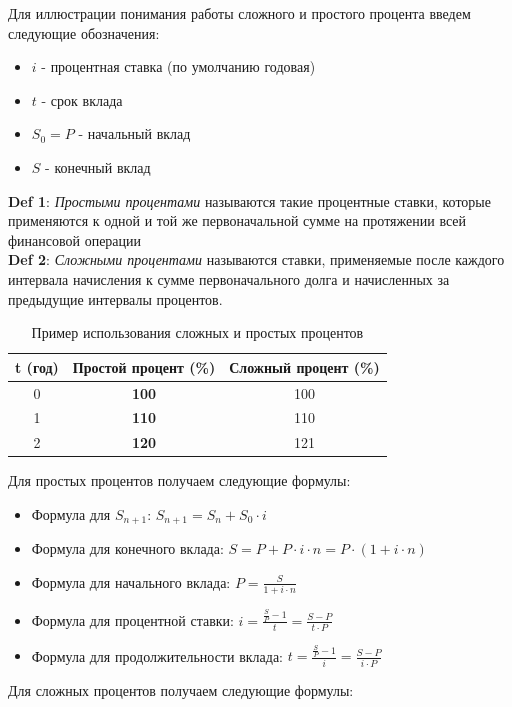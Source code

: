 \documentclass[aps,%
12pt,%
final,%
oneside,
onecolumn,%
musixtex, %
superscriptaddress,%
centertags]{article} %
\begin{document}
Для иллюстрации понимания работы сложного и простого процента введем следующие обозначения:
\begin{itemize} 
  \item $i$ - процентная ставка (по умолчанию годовая)
  \item $t$ - срок вклада
  \item $S_{0} = P$ - начальный вклад
  \item \textbf{$S$} - конечный вклад
  
\end{itemize}
\textbf{Def 1}: \textit{Простыми процентами} называются такие процентные ставки, которые применяются к одной и той же первоначальной сумме на протяжении всей финансовой операции \\
\textbf{Def 2}: \textit{Сложными процентами} называются ставки, применяемые после каждого интервала начисления к сумме первоначального долга и начисленных за предыдущие интервалы процентов.

\label{first_table}
\begin{table}[H]
	\begin{center}
	
		\begin{tabular}{c|c|c} 
		t (год) & Простой процент (\%) & Сложный процент (\%) \\ \hline
		0 & \textbf{100} & 100  \\ 
		1 & \textbf{110} & 110 \\ 
		2 & \textbf{120} & 121
		\end{tabular}
	\caption{Пример использования сложных и простых процентов}
	\end{center}
\end{table}
\begin{flushleft}
	Для простых процентов получаем следующие формулы:
\end{flushleft}

\begin{itemize} 
	\item Формула для $S_{n+1}$: $S_{n+1}=S_n+S_0\cdot i  $
	\item Формула для конечного вклада: $S=P+P\cdot i\cdot n=P\cdot (1+i\cdot n) $
	\item Формула для начального вклада: $P=\frac{S}{1+i\cdot n} $ 
	\item Формула для процентной ставки: $i=\frac{\frac{S}{P}-1}{t}=\frac{S-P}{t\cdot P}$
	\item Формула для продолжительности вклада: $ t=\frac{\frac{S}{P}-1}{i}=\frac{S-P}{i\cdot P}$
\end{itemize}
\begin{flushleft}
	Для сложных процентов получаем следующие формулы:
\end{flushleft}
\end{document}
